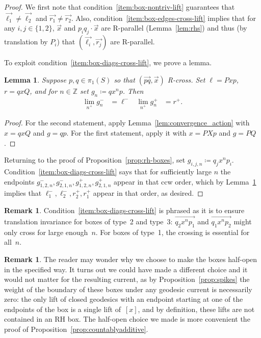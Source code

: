 \documentclass[11pt]{amsart}
\newcommand{\ora}[1]{\overrightarrow{#1}}
\numberwithin{equation}{section}
\numberwithin{figure}{section}
\newtheorem{lemma}[theorem]{Lemma}
\theoremstyle{definition}
\newtheorem{remark}[theorem]{Remark}
\theoremstyle{plain}
\newcommand\bbZ{\ensuremath{\mathbb{Z}}}
\begin{document}
\begin{proof}
  We first note that condition~\ref{item:box-nontriv-lift} guarantees that $\ora{\ell_1} \ne \ora{\ell_2}$ and $\ora{r_1} \ne \ora{r_2}$. Also, condition~\ref{item:box-edges-cross-lift} implies
  that for any $i,j \in \{1,2\}$, $\ora{x}$ and $p_iq_j\cdot \ora{x}$
  are R-parallel (Lemma~\ref{lem:rhs}) and thus (by translation by
  $P_i$) that $(\ora{\ell_i}, \ora{r_j})$ are R-parallel.

  To exploit condition~\ref{item:box-diags-cross-lift}, we prove a lemma.
  
  \begin{lemma}\label{lem:box-endpoints}
    Suppose $p,q \in \pi_1(S)$ so that $(\ora{pq},\ora{x})$ R-cross.
    Set $\ell = Pxp$, $r = qxQ$, and
    for $n \in \bbZ$ set $g_n \coloneqq q x^n p$. Then
    \begin{align*}
      \lim_{n^+} g_n^- &= \ell^- &
      \lim_{n^+} g_n^+ &= r^+.
    \end{align*}
  \end{lemma}

  \begin{proof}
  For the second statement, apply Lemma~\ref{lem:convergence_action} with $x=qxQ$ and $g=qp$.
  For the first statement, apply it with $x=PXp$ and $g=PQ$.
  \end{proof}

  Returning to the proof of Proposition~\ref{prop:rh-boxes}, set
  $g_{i,j,n} \coloneqq q_j x^n p_i$.
  Condition~\ref{item:box-diags-cross-lift} says that for sufficiently large $n$
  the endpoints $g_{1,2,n}^-, g_{2,1,n}^-, g_{1,2,n}^+, g_{2,1,n}^+$
  appear in that ccw order, which by Lemma~\ref{lem:box-endpoints} implies
  that $\ell_1^-,\ell_2^-,r_2^+,r_1^+$ appear in that order, as desired.
\end{proof}

\begin{remark}
 Condition~\ref{item:box-diags-cross-lift} is
 phrased as it is to ensure translation invariance for boxes of type~2
 and type~3: $\ora{q_2 x^n p_1}$ and $\ora{q_1 x^n p_2}$ might only cross for large
 enough~$n$.
 For boxes of type~1, the crossing is essential for all~$n$.
\label{rmk:largeenough}
\end{remark}

\begin{remark}
  The reader may wonder why we choose to make the boxes half-open in
  the specified way. It turns out we could have made a different choice and it would not matter for the resulting current, as by
  Proposition~\ref{prop:spikes}
  the weight of the
  boundary of these boxes under any geodesic current is necessarily
  zero: the only lift of closed geodesics with an endpoint starting at one of the endpoints of the box is a single lift of~$[x]$, and by definition, these lifts are not contained in an RH box. The half-open
  choice we made is
  more convenient the proof of Proposition~\ref{prop:countablyadditive}.
  \label{rmk:no_atom_boundary_box}
\end{remark}
\end{document}
